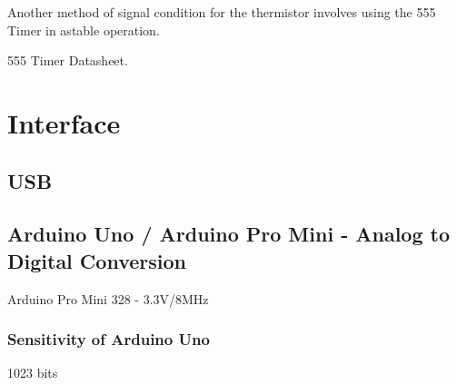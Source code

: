 Another method of signal condition for the thermistor involves using the 555 Timer in astable operation. 

555 Timer Datasheet. 

\section{Interface}

\subsection{USB}

\subsection{Arduino Uno / Arduino Pro Mini - Analog to Digital Conversion}
\label{arduino}

Arduino Pro Mini 328 - 3.3V/8MHz

\subsubsection{Sensitivity of Arduino Uno} 

1023 bits